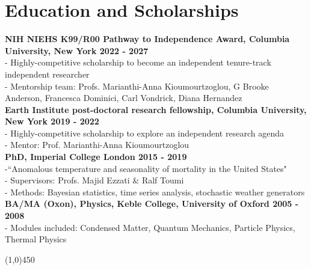 \section*{Education and Scholarships}

\textbf{NIH NIEHS K99/R00 Pathway to Independence Award, Columbia University, New York \hfill 2022 - 2027}\\
- Highly-competitive scholarship to become an independent tenure-track independent researcher\\
- Mentorship team: Profs. Marianthi-Anna Kioumourtzoglou, G Brooke Anderson, Francesca Dominici, Carl Vondrick, Diana Hernandez\\

\noindent \textbf{Earth Institute post-doctoral research fellowship, Columbia University, New York \hfill 2019 - 2022}\\
- Highly-competitive scholarship to explore an independent research agenda\\
- Mentor: Prof. Marianthi-Anna Kioumourtzoglou\\

\noindent \textbf{PhD, Imperial College London \hfill 2015 - 2019}\\
-``Anomalous temperature and seasonality of mortality in the United States"\\	 		
- Supervisors: Profs. Majid Ezzati \& Ralf Toumi\\
- Methods: Bayesian statistics, time series analysis, stochastic weather generators\\

\noindent \textbf{BA/MA (Oxon), Physics, Keble College, University of Oxford \hfill 2005 - 2008}\\
- Modules included: Condensed Matter,  Quantum Mechanics, Particle Physics, Thermal Physics		                             

\begin{center} \line(1,0){450} \end{center}